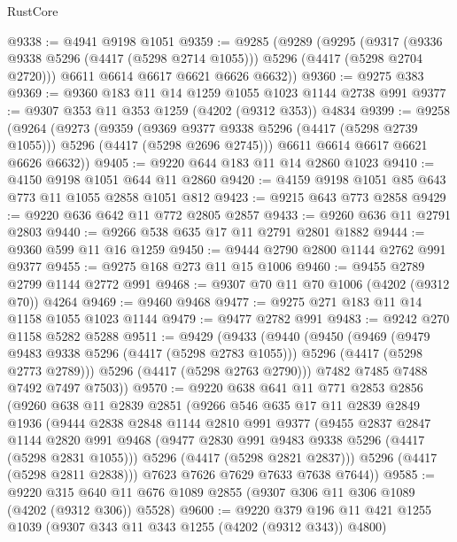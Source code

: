 \begin{lexlean}{RustCore}
\begin{coremodule}
@9338 := @4941 @9198 @1051
@9359 := @9285
    (@9289
      (@9295
        (@9317 (@9336 @9338 @5296 (@4417 (@5298 @2714 @1055))) @5296 (@4417 (@5298 @2704 @2720)))
        @6611
        @6614
        @6617
        @6621
        @6626
        @6632))
@9360 := @9275 @383
@9369 := @9360 @183 @11 @14 @1259 @1055 @1023 @1144 @2738 @991
@9377 := @9307 @353 @11 @353 @1259 (@4202 (@9312 @353)) @4834
@9399 := @9258
    (@9264
      (@9273
        (@9359
          (@9369 @9377 @9338 @5296 (@4417 (@5298 @2739 @1055)))
          @5296
          (@4417 (@5298 @2696 @2745)))
        @6611
        @6614
        @6617
        @6621
        @6626
        @6632))
@9405 := @9220 @644 @183 @11 @14 @2860 @1023
@9410 := @4150 @9198 @1051 @644 @11 @2860
@9420 := @4159 @9198 @1051 @85 @643 @773 @11 @1055 @2858 @1051 @812
@9423 := @9215 @643 @773 @2858
@9429 := @9220 @636 @642 @11 @772 @2805 @2857
@9433 := @9260 @636 @11 @2791 @2803
@9440 := @9266 @538 @635 @17 @11 @2791 @2801 @1882
@9444 := @9360 @599 @11 @16 @1259
@9450 := @9444 @2790 @2800 @1144 @2762 @991 @9377
@9455 := @9275 @168 @273 @11 @15 @1006
@9460 := @9455 @2789 @2799 @1144 @2772 @991
@9468 := @9307 @70 @11 @70 @1006 (@4202 (@9312 @70)) @4264
@9469 := @9460 @9468
@9477 := @9275 @271 @183 @11 @14 @1158 @1055 @1023 @1144
@9479 := @9477 @2782 @991
@9483 := @9242 @270 @1158 @5282 @5288
@9511 := @9429
    (@9433
      (@9440
        (@9450
          (@9469
            (@9479 @9483 @9338 @5296 (@4417 (@5298 @2783 @1055)))
            @5296
            (@4417 (@5298 @2773 @2789)))
          @5296
          (@4417 (@5298 @2763 @2790)))
        @7482
        @7485
        @7488
        @7492
        @7497
        @7503))
@9570 := @9220
    @638
    @641
    @11
    @771
    @2853
    @2856
    (@9260
      @638
      @11
      @2839
      @2851
      (@9266
        @546
        @635
        @17
        @11
        @2839
        @2849
        @1936
        (@9444
          @2838
          @2848
          @1144
          @2810
          @991
          @9377
          (@9455
            @2837
            @2847
            @1144
            @2820
            @991
            @9468
            (@9477 @2830 @991 @9483 @9338 @5296 (@4417 (@5298 @2831 @1055)))
            @5296
            (@4417 (@5298 @2821 @2837)))
          @5296
          (@4417 (@5298 @2811 @2838)))
        @7623
        @7626
        @7629
        @7633
        @7638
        @7644))
@9585 := @9220 @315 @640 @11 @676 @1089 @2855 (@9307 @306 @11 @306 @1089 (@4202 (@9312 @306)) @5528)
@9600 := @9220 @379 @196 @11 @421 @1255 @1039 (@9307 @343 @11 @343 @1255 (@4202 (@9312 @343)) @4800)

\end{coremodule}
\end{lexlean}
